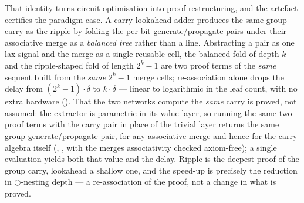 That identity turns circuit optimisation into proof restructuring, and
the artefact certifies the paradigm case. A carry-lookahead adder
produces the same group carry as the ripple by folding the per-bit
generate/propagate pairs under their associative merge as a
\emph{balanced tree} rather than a line. Abstracting a pair as one lax
signal and the merge as a single reusable cell, the balanced fold of
depth \ensuremath{k} and the ripple-shaped fold of length
\ensuremath{2^{k}-1} are two proof terms of the \emph{same} sequent
built from the \emph{same} \ensuremath{2^{k}-1} merge cells;
re-association alone drops the delay from
\ensuremath{(2^{k}-1)\cdot\delta} to \ensuremath{k\cdot\delta} --- linear
to logarithmic in the leaf count, with no extra hardware
(). That the two networks compute the
\emph{same} carry is proved, not assumed: the extractor is parametric in
its value layer, so running the same two proof terms with the carry pair
in place of the trivial layer returns the same group
generate/propagate pair, for any associative merge and hence for the
carry algebra itself (,
, with the merge\textquotesingle s
associativity checked axiom-free); a single evaluation yields both that
value and the delay. Ripple is the deepest proof of the group carry,
lookahead a shallow one, and the speed-up is precisely the reduction in
\ensuremath{\bigcirc}-nesting depth --- a re-association of the proof, not
a change in what is proved.

